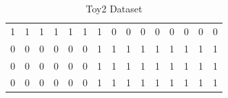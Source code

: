 \documentclass{article}
\begin{document}
\begin{table}[h]
  \centering
  \begin{tabular}{c| c| c| c| c| c| c| c|c|c|c|c|c|c|c}
    \hline
    1 & 1 & 1 & 1 & 1 & 1 & 1 & 0 & 0 & 0 & 0 & 0 & 0 & 0 & 0 \\
    0 & 0 & 0 & 0 & 0 & 0 & 1 & 1 & 1 & 1 & 1 & 1 & 1 & 1 & 1 \\ 
    0 & 0 & 0 & 0 & 0 & 0 & 1 & 1 & 1 & 1 & 1 & 1 & 1 & 1 & 1 \\ 
    0 & 0 & 0 & 0 & 0 & 0 & 1 & 1 & 1 & 1 & 1 & 1 & 1 & 1 & 1 \\ 
    \hline
  \end{tabular}
    \caption{Toy2 Dataset}
    \label{tab:toy2}

\end{table}

\begin{figure}[h]
  \centering


\end{figure}
\end{document}
